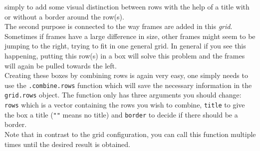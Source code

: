 \documentclass[a4paper]{article}\usepackage[]{graphicx}\usepackage[]{color}
\begin{document}
simply to add some visual distinction between rows with the help of a title with
or without a border around the row(s).\\
The second purpose is connected to the way frames are added in this {\it grid}.
Sometimes if frames have a large difference in size, other frames might seem to
be jumping to the right, trying to fit in one general grid. In general if you
see this happening, putting this row(s) in a box will solve this problem and the
frames will again be pulled towards the left.\\
Creating these boxes by combining rows is again very easy, one simply needs to
use the \verb|.combine.rows| function which will save the necessary information
in the \verb|grid.rows| object. The function only has three arguments you should
change: \verb|rows| which is a vector containing the rows you wish to
combine, \verb|title| to give the box a title (\verb|""| means no title) and
\verb|border| to decide if there should be a border.\\
Note that in contrast to the grid configuration, you can call this function
multiple times until the desired result is obtained.
\end{document}

